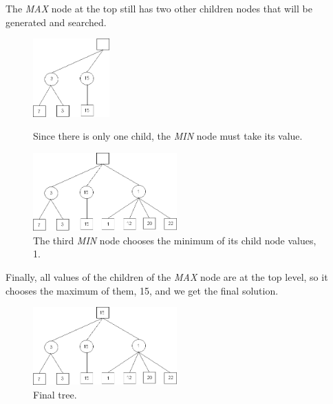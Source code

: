 The \textit{MAX} node at the top still has two other children nodes that will be generated and searched.

\begin{figure}[H]
\centering
	\begin{minipage}[b]{0.45\linewidth}
		\centering
		\includegraphics[height=3cm]{3Algorithms/3.2Algorithm_MCTS_Benoit/img/Minimax6.png}
		\caption{\label{fig:Minimax6}Since there is only one child, the \textit{MIN} node must take its value.}
		\end{minipage}%
	\hspace*{1cm}
	\begin{minipage}[b]{0.45\linewidth}
		\centering
		\includegraphics[height=3cm]{3Algorithms/3.2Algorithm_MCTS_Benoit/img/Minimax8.png}
		\caption{\label{fig:Minimax8}The third \textit{MIN} node chooses the minimum of its child node values, 1.}
	\end{minipage}%
\end{figure}

Finally, all values of the children of the \textit{MAX} node are at the top level, so it chooses the maximum of them, 15, and we get the final solution. 

\begin{figure}[H]
\centering
	\begin{minipage}[b]{1\linewidth}
		\centering
		\includegraphics[height=3cm]{3Algorithms/3.2Algorithm_MCTS_Benoit/img/Minimax9.png}
		\caption{\label{fig:Minimax9}Final tree.}
	\end{minipage}%
\end{figure}

